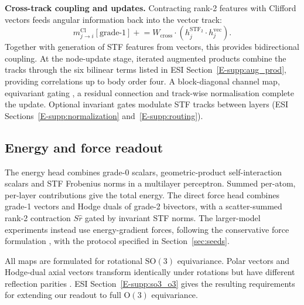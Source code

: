 \textbf{Cross-track coupling and updates.} Contracting rank-2 features with Clifford vectors feeds angular information back into the vector track:
\[
m^{\mathrm{Cl}}_{j\to i}[\text{grade-1}]\mathrel{+}=W_{\mathrm{cross}}\cdot(h_j^{\mathrm{STF}_2}\cdot h_j^{\mathrm{vec}}).
\]
Together with generation of STF features from vectors, this provides bidirectional coupling. At the node-update stage, iterated augmented products combine the tracks through the six bilinear terms listed in ESI Section~\ref{E-supp:aug_prod}, providing correlations up to body order four. A block-diagonal channel map, equivariant gating \cite{weiler20183d}, a residual connection \cite{he2016residual} and track-wise normalisation complete the update. Optional invariant gates modulate STF tracks between layers (ESI Sections~\ref{E-supp:normalization} and~\ref{E-supp:routing}).

\subsection{Energy and force readout}\label{sec:readout}

The energy head combines grade-0 scalars, geometric-product self-interaction scalars and STF Frobenius norms in a multilayer perceptron. Summed per-atom, per-layer contributions give the total energy. The direct force head combines grade-1 vectors and Hodge duals of grade-2 bivectors, with a scatter-summed rank-2 contraction $S\hat r$ gated by invariant STF norms. The larger-model experiments instead use energy-gradient forces, following the conservative force formulation \cite{chmiela2017conservative}, with the protocol specified in Section~\ref{sec:seeds}.

\label{rem:so3_vs_o3}All maps are formulated for rotational $\mathrm{SO}(3)$ equivariance. Polar vectors and Hodge-dual axial vectors transform identically under rotations but have different reflection parities \cite{geiger2022e3nn}. ESI Section~\ref{E-supp:so3_o3} gives the resulting requirements for extending our readout to full $\mathrm{O}(3)$ equivariance.
